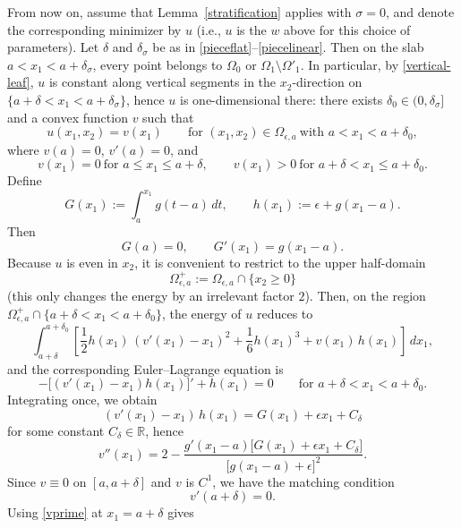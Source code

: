 \documentclass[reqno,11pt]{amsart}
\numberwithin{equation}{section}
\theoremstyle{remark}
\begin{document}
From now on, assume that Lemma~\ref{stratification} applies with $\sigma=0$, and denote the corresponding minimizer by $u$
(i.e., $u$ is the $w$ above for this choice of parameters). Let $\delta$ and $\delta_\sigma$ be as in
\eqref{pieceflat}--\eqref{piecelinear}. Then on the slab $a<x_1<a+\delta_\sigma$, every point belongs to
$\Omega_{0}$ or $\Omega_{1}\setminus\Omega'_{1}$. In particular, by \eqref{vertical-leaf}, $u$ is constant along vertical
segments in the $x_2$-direction on $\{a+\delta<x_1<a+\delta_\sigma\}$, hence $u$ is one-dimensional there:
there exists $\delta_0\in(0,\delta_\sigma]$ and a convex function $v$ such that
\begin{equation}\label{u-to-v}
u(x_1,x_2)=v(x_1)\qquad\text{for }(x_1,x_2)\in \Omega_{\epsilon,a}\ \text{with }a<x_1<a+\delta_0,
\end{equation}
where $v(a)=0$, $v'(a)=0$, and
\[
v(x_1)=0 \ \text{for }a\le x_1\le a+\delta,
\qquad
v(x_1)>0 \ \text{for }a+\delta<x_1\le a+\delta_0.
\]
Define
\[
G(x_1):=\int_a^{x_1} g(t-a)\,dt,
\qquad
h(x_1):=\epsilon+g(x_1-a).
\]
Then
\[
G(a)=0,
\qquad
G'(x_1)=g(x_1-a).
\]
Because $u$ is even in $x_2$, it is convenient to restrict to the upper half-domain
\[
\Omega_{\epsilon,a}^+:=\Omega_{\epsilon,a}\cap\{x_2\ge0\}
\]
(this only changes the energy by an irrelevant factor $2$).
Then, on the region $\Omega_{\epsilon,a}^+\cap\{a+\delta<x_1<a+\delta_0\}$, the energy of $u$ reduces to
\begin{equation}\label{reduced-energy}
\int_{a+\delta}^{a+\delta_0}
\left[
\frac{1}{2} h(x_1)\,(v'(x_1)-x_1)^2
+\frac{1}{6} h(x_1)^3
+v(x_1)\,h(x_1)
\right]\,dx_1,
\end{equation}
and the corresponding Euler--Lagrange equation is
\begin{equation}\label{EL-v}
-\bigl[(v'(x_1)-x_1)h(x_1)\bigr]'+h(x_1)=0
\qquad\text{for }a+\delta<x_1<a+\delta_0.
\end{equation}
Integrating once, we obtain
\begin{equation}\label{vprime}
(v'(x_1)-x_1)\,h(x_1)=G(x_1)+\epsilon x_1 + C_\delta
\end{equation}
for some constant $C_\delta\in\mathbb R$, hence
\begin{equation}\label{vsecond-general}
v''(x_1)
=2-\frac{g'(x_1-a)\bigl[G(x_1)+\epsilon x_1+C_\delta\bigr]}{\bigl[g(x_1-a)+\epsilon\bigr]^2}.
\end{equation}
Since $v\equiv 0$ on $[a,a+\delta]$ and $v$ is $C^1$, we have the matching condition
\[
v'(a+\delta)=0.
\]
Using \eqref{vprime} at $x_1=a+\delta$ gives
\end{document}

